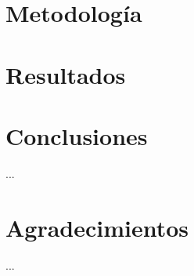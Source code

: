 \documentclass[runningheads,a4paper]{llncs}
\begin{document}
\section{Metodología}
\label{sec:metodologia}

\section{Resultados}
\label{sec:resultados}

\section{Conclusiones}
\label{sec:conclusiones}

...


\section*{Agradecimientos} 

...


%




\end{document}
